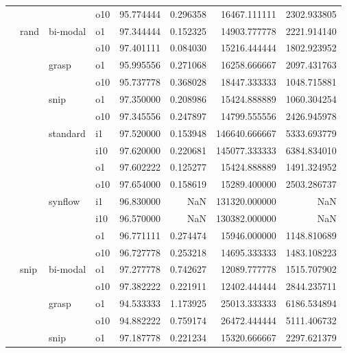 \begin{longtable}{llllrrrr}
      &     &         & o10 &  95.774444 &   0.296358 &     16467.111111 &   2302.933805 \\
      & rand & bi-modal & o1 &  97.344444 &   0.152325 &     14903.777778 &   2221.914140 \\
      &     &         & o10 &  97.401111 &   0.084030 &     15216.444444 &   1802.923952 \\
      &     & grasp & o1 &  95.995556 &   0.271068 &     16258.666667 &   2097.431763 \\
      &     &         & o10 &  95.737778 &   0.368028 &     18447.333333 &   1048.715881 \\
      &     & snip & o1 &  97.350000 &   0.208986 &     15424.888889 &   1060.304254 \\
      &     &         & o10 &  97.345556 &   0.247897 &     14799.555556 &   2426.945978 \\
      &     & standard & i1 &  97.520000 &   0.153948 &    146640.666667 &   5333.693779 \\
      &     &         & i10 &  97.620000 &   0.220681 &    145077.333333 &   6384.834010 \\
      &     &         & o1 &  97.602222 &   0.125277 &     15424.888889 &   1491.324952 \\
      &     &         & o10 &  97.654000 &   0.158619 &     15289.400000 &   2503.286737 \\
      &     & synflow & i1 &  96.830000 &        NaN &    131320.000000 &           NaN \\
      &     &         & i10 &  96.570000 &        NaN &    130382.000000 &           NaN \\
      &     &         & o1 &  96.771111 &   0.274474 &     15946.000000 &   1148.810689 \\
      &     &         & o10 &  96.727778 &   0.253218 &     14695.333333 &   1483.108223 \\
      & snip & bi-modal & o1 &  97.277778 &   0.742627 &     12089.777778 &   1515.707902 \\
      &     &         & o10 &  97.382222 &   0.221911 &     12402.444444 &   2844.235711 \\
      &     & grasp & o1 &  94.533333 &   1.173925 &     25013.333333 &   6186.534894 \\
      &     &         & o10 &  94.882222 &   0.759174 &     26472.444444 &   5111.406732 \\
      &     & snip & o1 &  97.187778 &   0.221234 &     15320.666667 &   2297.621379 \\

\end{longtable}
